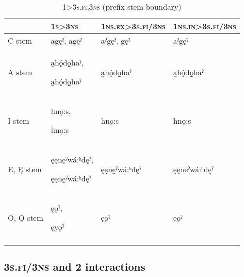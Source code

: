 \begin{table}
\caption{\textsc{1>3s.fi,3ns} (prefix-stem boundary)}
\label{figtab:I/we:her/them.end}
{
\begin{tabularx}{\textwidth}{lQQQ}
\lsptoprule
&\textsc{1s>3ns}&\textsc{1ns.ex>3s.fi/3ns}&\textsc{1ns.in>3s.fi/3ns}\\
\midrule 
C stem&

agęˀ, agęˀ&

aˀgęˀ, gęˀ&

aˀgęˀ\\
\tablevspace
A stem&

\-a̱hǫ́dǫ̱haˀ, 

\-a̱hǫ́dǫ̱haˀ&

\-a̱hǫ́dǫ̱haˀ&

\-a̱hǫ́dǫ̱haˀ\\
\tablevspace
I stem&

hnǫ:s, 

hnǫ:s&

hnǫ:s&

hnǫ:s\\
\tablevspace
E, Ę stem&

ęęne̱ˀ\-wá:ʰdęˀ, 

ęęne̱ˀ\-wá:ʰdęˀ&

ęęne̱ˀ\-wá:ʰdęˀ&

ęęneˀ\-wá:ʰdęˀ\\
\tablevspace
O, Ǫ stem&

ęǫˀ, 

ęyǫˀ&

ęǫˀ&

ęǫˀ\\
\lspbottomrule
\end{tabularx}}
\end{table}

\clearpage
\subsection{\textsc{3s.fi/3ns} and \textsc{2} interactions}

